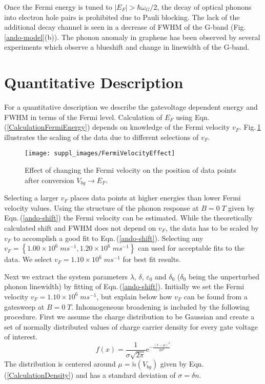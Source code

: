 \documentclass[pra,aps,superscriptaddress,preprint]{revtex4-1}
\begin{document}
Once the Fermi energy is tuned to $\left| E_F \right| >\hbar\omega_G /2$, the decay of optical phonons into electron hole pairs is prohibited due to Pauli blocking. The lack of the additional decay channel is seen in a decrease of FWHM of the G-band (Fig.\,\ref{ando-model}(b)). The phonon anomaly in graphene has been observed by several experiments \cite{pisana2007breakdown,yan2007electric} which observe a blueshift and change in linewidth of the G-band.

\section{Quantitative Description}
\label{Quant-Descr}
For a quantitative description we describe the gatevoltage dependent energy and FWHM in terms of the Fermi level. Calculation of $E_F$ using Eqn.\,(\ref{CalculationFermiEnergy}) depends on knowledge of the Fermi velocity $v_F$. Fig.\,\ref{FermiVelocityEffect} illustrates the scaling of the data due to different selections of $v_F$.
\begin{figure}[h]
   \texttt{[image: suppl\_images/FermiVelocityEffect]}
   \caption{\label{FermiVelocityEffect}Effect of changing the Fermi velocity on the position of data points after conversion $V_{bg}\rightarrow E_F$.}
\end{figure}
Selecting a larger $v_F$ places data points at higher energies than lower Fermi velocity values. Using the structure of the phonon response at $B=0\; T$ given by Eqn.\,(\ref{ando-shift}) the Fermi velocity can be estimated. While the theoretically calculated shift and FWHM does not depend on $v_F$, the data has to be scaled by $v_F$ to accomplish a good fit to Eqn.\,(\ref{ando-shift}). 
Selecting any $v_F = \left\lbrace 1.00\times 10^6 \; ms^{-1}, 1.20\times 10^6 \; ms^{-1} \right\rbrace$ can used for acceptable fits to the data. We select $v_F=1.10\times  10^6 \; ms^{-1}$ for best fit results. 

Next we extract the system parameters $\lambda$, $\delta$, $\varepsilon_0$ and $\delta_0$ ($\delta_0$ being the unperturbed phonon linewidth) by fitting of Eqn.\,(\ref{ando-shift}). Initially we set the Fermi velocity $v_F=1.10\times 10^6 \; ms^{-1}$, but explain below how $v_F$ can be found from a gatesweep at $B=0\; T$. Inhomogeneous broadening is included by the following procedure. First we assume the charge distribution to be Gaussian and create a set of normally distributed values of charge carrier density for every gate voltage of interest.
\begin{equation}
\label{GaussianDistro}
f(x) = \frac{1}{\sigma \sqrt{2\pi}}\mathrm{e}^{-\frac{\left(x-\mu\right)^2}{2\sigma^2}}
\end{equation}
The distribution is centered around $\mu = \widetilde{n}(V_{bg})$ given by Eqn.\,(\ref{CalculationDensity}) and has a standard deviation of $\sigma = \delta n$. 
\end{document}
